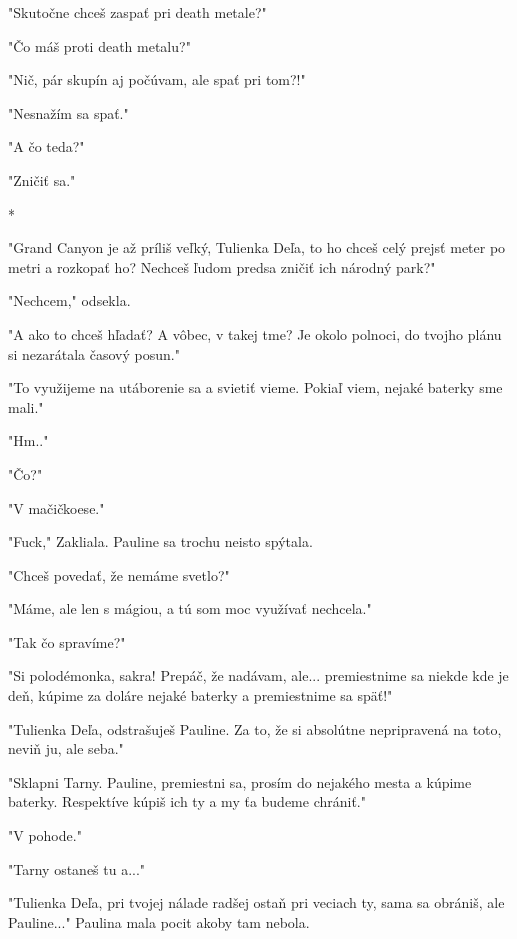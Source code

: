 \documentclass{book}
\begin{document}
"$ $Skutočne chceš zaspať pri death metale?"$ $ 

"$ $Čo máš proti death metalu?"$ $ 

"$ $Nič, pár skupín aj počúvam, ale spať pri tom?!"$ $ 

"$ $Nesnažím sa spať."$ $ 

"$ $A čo teda?"$ $ 

"$ $Zničiť sa."$ $ 

\begin{center}

*

\end{center}

"$ $Grand Canyon je až príliš veľký, Tulienka Deľa, to ho chceš celý prejsť meter po metri a rozkopať ho? Nechceš ľudom predsa zničiť ich národný park?"$ $ 

"$ $Nechcem,"$ $  odsekla.

"$ $A ako to chceš hľadať? A vôbec, v takej tme? Je okolo polnoci, do tvojho plánu si nezarátala časový posun."$ $ 

"$ $To využijeme na utáborenie sa a svietiť vieme. Pokiaľ viem, nejaké baterky sme mali."$ $ 

"$ $Hm.."$ $ 

"$ $Čo?"$ $ 

"$ $V mačičkoese."$ $ 

"$ $Fuck,"$ $  Zakliala. Pauline sa trochu neisto spýtala.

"$ $Chceš povedať, že nemáme svetlo?"$ $  

"$ $Máme, ale len s mágiou, a tú som moc využívať nechcela."$ $ 

"$ $Tak čo spravíme?"$ $ 

"$ $Si polodémonka, sakra! Prepáč, že nadávam, ale... premiestnime sa niekde kde je deň, kúpime za doláre nejaké baterky a premiestnime sa späť!"$ $ 

"$ $Tulienka Deľa, odstrašuješ Pauline. Za to, že si absolútne nepripravená na toto, neviň ju, ale seba."$ $ 

"$ $Sklapni Tarny. Pauline, premiestni sa, prosím do nejakého mesta a kúpime baterky. Respektíve kúpiš ich ty a my ťa budeme chrániť."$ $ 

"$ $V pohode."$ $ 

"$ $Tarny ostaneš tu a..."$ $ 

"$ $Tulienka Deľa, pri tvojej nálade radšej ostaň pri veciach ty, sama sa obrániš, ale Pauline..."$ $  Paulina mala pocit akoby tam nebola.
\end{document}
